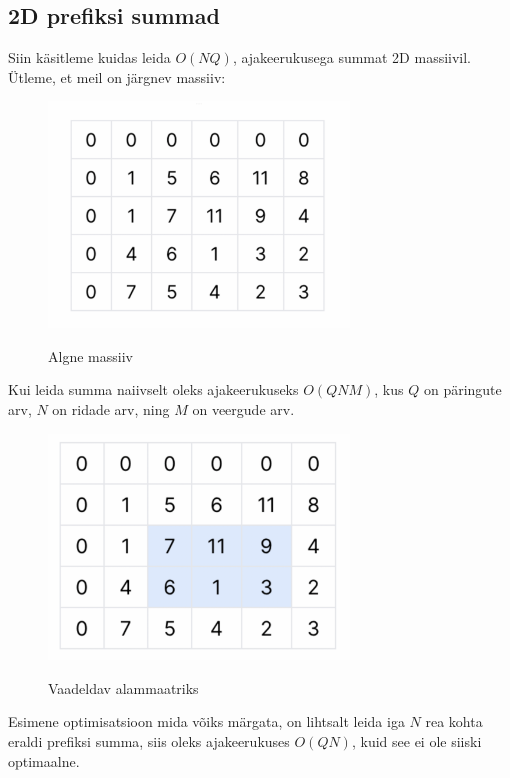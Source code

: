 \documentclass{trkut}
\theoremstyle{definition}
\begin{document}
\begin{appendices}
    \chapter{2D prefiksi summad}\label{lisa12}
    \tiny
    \normalsize
Siin käsitleme kuidas leida $O(NQ)$, ajakeerukusega summat 2D massiivil.
Ütleme, et meil on järgnev massiiv:
  \begin{figure}[H]%
    \includegraphics[width=8cm]{pr1.png}%
    \caption{Algne massiiv}%
    \label{EMaxx}%
\end{figure}
Kui leida summa naiivselt oleks ajakeerukuseks $O(QNM)$, kus $Q$ on päringute arv, $N$ on ridade arv, ning $M$ on veergude arv.
\begin{figure}[H]%
    \includegraphics[width=8cm]{pr4.png}%
    \caption{Vaadeldav alammaatriks}%
    \label{EMaxx}%
\end{figure}

Esimene optimisatsioon mida võiks märgata, on lihtsalt leida iga $N$ rea kohta eraldi prefiksi summa, siis oleks ajakeerukuses $O(QN)$, kuid see ei ole siiski optimaalne.


\end{appendices}
\end{document}
